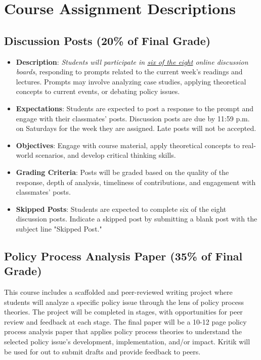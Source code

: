 \documentclass[12pt, letterpaper]{article}
\begin{document}
\section{Course Assignment Descriptions}
\subsection*{Discussion Posts (20\% of Final Grade)} 
\begin{itemize}
    \item \textbf{Description}: \emph{Students will participate in \underline{six of the eight} online discussion boards}, responding to prompts related to the current week's readings and lectures. Prompts may involve analyzing case studies, applying theoretical concepts to current events, or debating policy issues.
    \item \textbf{Expectations}: Students are expected to post a response to the prompt and engage with their classmates' posts. Discussion posts are due by 11:59 p.m. on Saturdays for the week they are assigned. Late posts will not be accepted.
    \item \textbf{Objectives}: Engage with course material, apply theoretical concepts to real-world scenarios, and develop critical thinking skills.
    \item \textbf{Grading Criteria}: Posts will be graded based on the quality of the response, depth of analysis, timeliness of contributions, and engagement with classmates' posts.
    \item \textbf{Skipped Posts}: Students are expected to complete six of the eight discussion posts. Indicate a skipped post by submitting a blank post with the subject line "Skipped Post."
\end{itemize}

\subsection*{Policy Process Analysis Paper (35\% of Final Grade)}

This course includes a scaffolded and peer-reviewed writing project where students will analyze a specific policy issue through the lens of policy process theories. The project will be completed in stages, with opportunities for peer review and feedback at each stage. The final paper will be a 10-12 page policy process analysis paper that applies policy process theories to understand the selected policy issue's development, implementation, and/or impact. Kritik will be used for out to submit drafts and provide feedback to peers.
\end{document}
